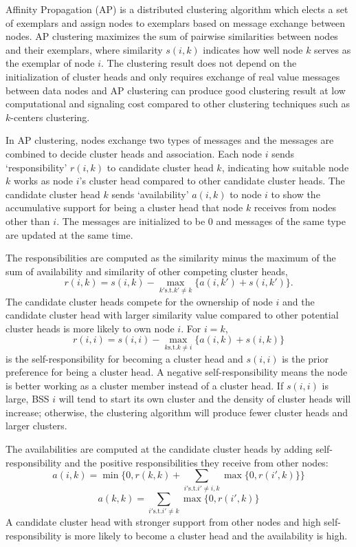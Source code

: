 \documentclass[10pt, conference, letterpaper]{IEEEtran}
\begin{document}
Affinity Propagation (AP) \cite{apcluster} is a distributed clustering algorithm which elects a set of exemplars and assign nodes to exemplars based on message exchange between nodes. AP clustering maximizes the sum of pairwise similarities between nodes and their exemplars, where similarity $s(i,k)$ indicates how well node $k$ serves as the exemplar of node $i$. The clustering result does not depend on the initialization of cluster heads and only requires exchange of real value messages between data nodes and AP clustering can produce good clustering result at low computational and signaling cost compared to other clustering techniques such as $k$-centers clustering.

In AP clustering, nodes exchange two types of messages and the messages are combined to decide cluster heads and association. Each node $i$ sends `responsibility' $r(i,k)$ to candidate cluster head $k$, indicating how suitable node $k$ works as node $i$'s cluster head compared to other candidate cluster heads. The candidate cluster head $k$ sends `availability' $a(i,k)$ to node $i$ to show the accumulative support for being a cluster head that node $k$ receives from nodes other than $i$. The messages are initialized to be 0 and messages of the same type are updated at the same time. 

The responsibilities are computed as the similarity minus the maximum of the sum of availability and similarity of other competing cluster heads,
\begin{equation}\label{eq:r_update}
r(i,k) = s(i,k) - \max_{k'\text{s.t.}k'\neq k}\{a(i,k') + s(i,k')\}.
\end{equation}
The candidate cluster heads compete for the ownership of node $i$ and the candidate cluster head with larger similarity value compared to other potential cluster heads is more likely to own node $i$. For $i = k$, 
$$r(i,i) = s(i,i) - \max_{k\text{s.t.}k\neq i}\{a(i,k) + s(i,k)\}$$ is the self-responsibility for becoming a cluster head and $s(i,i)$ is the prior preference for being a cluster head. A negative self-responsibility means the node is better working as a cluster member instead of a cluster head. If $s(i,i)$ is large, BSS $i$ will tend to start its own cluster and the density of cluster heads will increase; otherwise, the clustering algorithm will produce fewer cluster heads and larger clusters.

The availabilities are computed at the candidate cluster heads by adding self-responsibility and the positive responsibilities they receive from other nodes: 
\begin{equation}\label{eq:a_update1}
a(i,k) = \min \Big\{0, r(k,k) + \sum_{i'\text{s.t.}i'\neq i,k}\max \{0, r(i',k) \}\Big\}
\end{equation}
\begin{equation}\label{eq:a_update2}
a(k,k) =\sum_{i'\text{s.t.}i'\neq k}\max \{0, r(i',k) \}
\end{equation}
A candidate cluster head with stronger support from other nodes and high self-responsibility is more likely to become a cluster head and the availability is high. 
\end{document}
